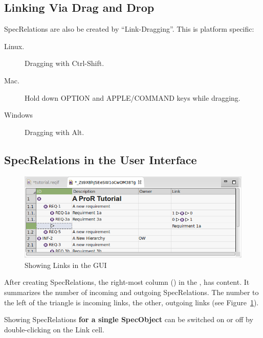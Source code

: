 \subsection{Linking Via Drag and Drop}

SpecRelations are also be created by ``Link-Dragging''.  This is platform specific:

\begin{description}

\item
  [Linux.] Dragging with Ctrl-Shift.
\item
  [Mac.] Hold down OPTION and APPLE/COMMAND keys while dragging.
\item
  [Windows] Dragging with Alt.
\end{description}

\subsection{SpecRelations in the User Interface}

\begin{figure}   
\centering      
\includegraphics[width=0.8\linewidth]{../rmf-images/links.png}      
\caption{Showing Links in the GUI}      
\label{fig:linksInGui}
\end{figure}

After creating SpecRelations, the right-most column () in the , has content.  It summarizes the number of incoming and outgoing SpecRelations.  The number to the left of the triangle is incoming links, the other, outgoing links (see Figure~\ref{fig:linksInGui}).

Showing SpecRelations \textbf{for a single SpecObject} can be switched on or off by double-clicking on the Link cell.

